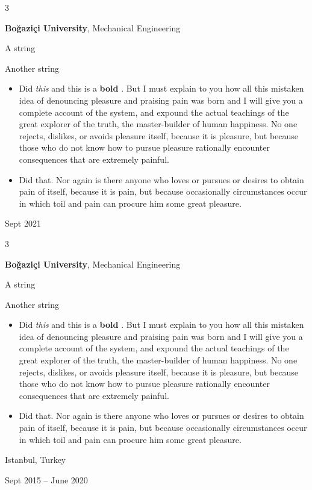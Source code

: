 \documentclass[10pt, letterpaper]{article}
\newenvironment{summary}{
    \begin{description}[
        topsep=0.10 cm,
        parsep=0.10 cm,
        partopsep=0pt,
        itemsep=0pt,
        leftmargin=0.4 cm + 10pt
    ]
}{
    \end{description}
} %
\newenvironment{highlights}{
    \begin{itemize}[
        topsep=0.10 cm,
        parsep=0.10 cm,
        partopsep=0pt,
        itemsep=0pt,
        leftmargin=0.4 cm + 10pt
    ]
}{
    \end{itemize}
} %
\newenvironment{threecolentry}[3][]{
    \onecolentry
    \def\thirdColumn{#3}
    \setcolumnwidth{1 cm, \fill, 4.5 cm}
    \begin{paracol}{3}
    {\raggedright #2} \switchcolumn
}{
    \switchcolumn \raggedleft \thirdColumn
    \end{paracol}
    \endonecolentry
} %
\let\hrefWithoutArrow\href
\renewcommand{\href}[2]{\hrefWithoutArrow{#1}{\ifthenelse{\equal{#2}{}}{ }{#2 }\raisebox{.15ex}{\footnotesize \faExternalLink*}}}
\begin{document}
        \begin{threecolentry}{\textbf{}}{
            Sept 2021
        }
            \textbf{Boğaziçi University}, Mechanical Engineering
            \begin{summary}
                \item A string
                \item Another string
            \end{summary}
            \begin{highlights}
                \item Did \textit{this} and this is a \textbf{bold} \href{https://example.com}{link}. But I must explain to you how all this mistaken idea of denouncing pleasure and praising pain was born and I will give you a complete account of the system, and expound the actual teachings of the great explorer of the truth, the master-builder of human happiness. No one rejects, dislikes, or avoids pleasure itself, because it is pleasure, but because those who do not know how to pursue pleasure rationally encounter consequences that are extremely painful.
                \item Did that. Nor again is there anyone who loves or pursues or desires to obtain pain of itself, because it is pain, but because occasionally circumstances occur in which toil and pain can procure him some great pleasure.
            \end{highlights}
        \end{threecolentry}

        \vspace{0.2 cm}

        \begin{threecolentry}{\textbf{}}{
            Istanbul, Turkey

        Sept 2015 – June 2020
        }
            \textbf{Boğaziçi University}, Mechanical Engineering
            \begin{summary}
                \item A string
                \item Another string
            \end{summary}
            \begin{highlights}
                \item Did \textit{this} and this is a \textbf{bold} \href{https://example.com}{link}. But I must explain to you how all this mistaken idea of denouncing pleasure and praising pain was born and I will give you a complete account of the system, and expound the actual teachings of the great explorer of the truth, the master-builder of human happiness. No one rejects, dislikes, or avoids pleasure itself, because it is pleasure, but because those who do not know how to pursue pleasure rationally encounter consequences that are extremely painful.
                \item Did that. Nor again is there anyone who loves or pursues or desires to obtain pain of itself, because it is pain, but because occasionally circumstances occur in which toil and pain can procure him some great pleasure.
            \end{highlights}
        \end{threecolentry}
\end{document}
